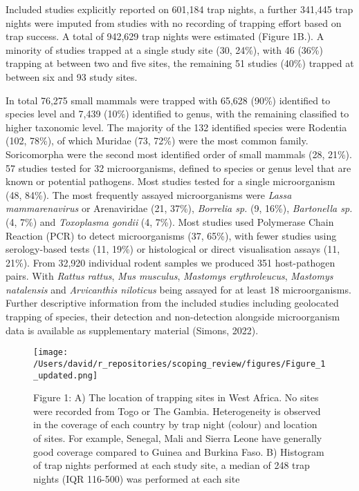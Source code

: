 \documentclass[
]{article}
\begin{document}
Included studies explicitly reported on 601,184 trap nights, a further
341,445 trap nights were imputed from studies with no recording of
trapping effort based on trap success. A total of 942,629 trap nights
were estimated (Figure 1B.). A minority of studies trapped at a single
study site (30, 24\%), with 46 (36\%) trapping at between two and five
sites, the remaining 51 studies (40\%) trapped at between six and 93
study sites.

In total 76,275 small mammals were trapped with 65,628 (90\%) identified
to species level and 7,439 (10\%) identified to genus, with the
remaining classified to higher taxonomic level. The majority of the 132
identified species were Rodentia (102, 78\%), of which Muridae (73,
72\%) were the most common family. Soricomorpha were the second most
identified order of small mammals (28, 21\%). 57 studies tested for 32
microorganisms, defined to species or genus level that are known or
potential pathogens. Most studies tested for a single microorganism (48,
84\%). The most frequently assayed microorganisms were \emph{Lassa
mammarenavirus} or Arenaviridae (21, 37\%), \emph{Borrelia sp.} (9,
16\%), \emph{Bartonella sp.} (4, 7\%) and \emph{Toxoplasma gondii} (4,
7\%). Most studies used Polymerase Chain Reaction (PCR) to detect
microorganisms (37, 65\%), with fewer studies using serology-based tests
(11, 19\%) or histological or direct visualisation assays (11, 21\%).
From 32,920 individual rodent samples we produced 351 host-pathogen
pairs. With \emph{Rattus rattus}, \emph{Mus musculus}, \emph{Mastomys
erythroleucus}, \emph{Mastomys natalensis} and \emph{Arvicanthis
niloticus} being assayed for at least 18 microorganisms. Further
descriptive information from the included studies including geolocated
trapping of species, their detection and non-detection alongside
microorganism data is available as supplementary material (Simons,
2022).

\begin{figure}
\centering
\texttt{[image: /Users/david/r\_repositories/scoping\_review/figures/Figure\_1\_updated.png]}
\caption{Figure 1: A) The location of trapping sites in West Africa. No
sites were recorded from Togo or The Gambia. Heterogeneity is observed
in the coverage of each country by trap night (colour) and location of
sites. For example, Senegal, Mali and Sierra Leone have generally good
coverage compared to Guinea and Burkina Faso. B) Histogram of trap
nights performed at each study site, a median of 248 trap nights (IQR
116-500) was performed at each site}
\end{figure}
\end{document}
